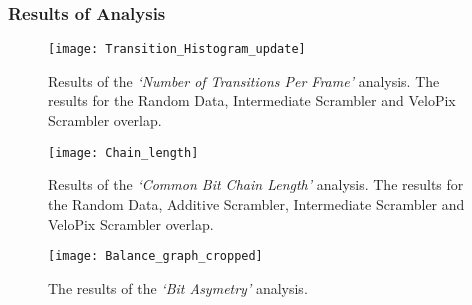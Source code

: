		\subsubsection{Results of Analysis}
		\label{subsub:algorithm_results}
			\begin{SCfigure}
				\centering
				\texttt{[image: Transition\_Histogram\_update]}
				\caption{Results of the \textit{`Number of Transitions Per Frame'} analysis. The results for the Random Data, Intermediate Scrambler and VeloPix Scrambler overlap.}
				\label{fig:transitions_per_frame}
			\end{SCfigure}
			\par
			\begin{SCfigure}
				\centering
				\texttt{[image: Chain\_length]}
				\caption{Results of the \textit{`Common Bit Chain Length'} analysis. The results for the Random Data, Additive Scrambler, Intermediate Scrambler and VeloPix Scrambler overlap.}
				\label{fig:chain_length}
			\end{SCfigure}
			\par
			\begin{figure}[ht]
				\centering
				\texttt{[image: Balance\_graph\_cropped]}
				\caption{The results of the \textit{`Bit Asymetry'} analysis.}
				\label{fig:bit_asym}
			\end{figure}

